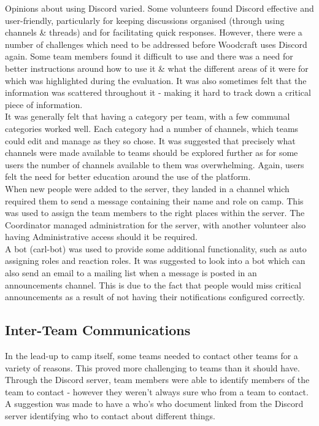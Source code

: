 Opinions about using Discord varied. Some volunteers found Discord effective and user-friendly, particularly for keeping discussions organised (through using channels \& threads) and for facilitating quick responses. However, there were a number of challenges which need to be addressed before Woodcraft uses Discord again. Some team members found it difficult to use and there was a need for better instructions around how to use it \& what the different areas of it were for which was highlighted during the evaluation. It was also sometimes felt that the information was scattered throughout it - making it hard to track down a critical piece of information. \\

It was generally felt that having a category per team, with a few communal categories worked well. Each category had a number of channels, which teams could edit and manage as they so chose. It was suggested that precisely what channels were made available to teams should be explored further as for some users the number of channels available to them was overwhelming. Again, users felt the need for better education around the use of the platform. \\

When new people were added to the server, they landed in a channel which required them to send a message containing their name and role on camp. This was used to assign the team members to the right places within the server. The Coordinator managed administration for the server, with another volunteer also having Administrative access should it be required.\\

A bot (carl-bot) was used to provide some additional functionality, such as auto assigning roles and reaction roles. It was suggested to look into a bot which can also send an email to a mailing list when a message is posted in an announcements channel. This is due to the fact that people would miss critical announcements as a result of not having their notifications configured correctly. 
\subsection{Inter-Team Communications}
In the lead-up to camp itself, some teams needed to contact other teams for a variety of reasons. This proved more challenging to teams than it should have. Through the Discord server, team members were able to identify members of the team to contact - however they weren't always sure who from a team to contact. A suggestion was made to have a who's who document linked from the Discord server identifying who to contact about different things. \\

